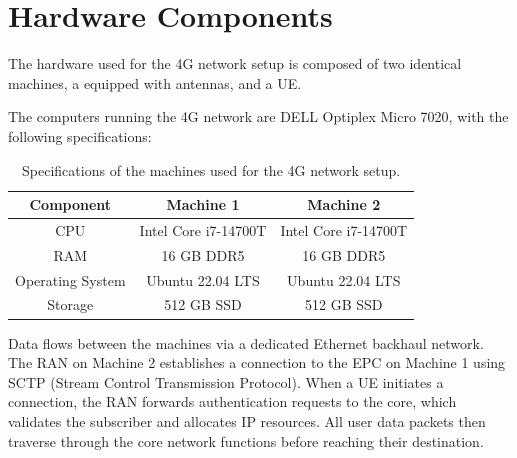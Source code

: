 \section{Hardware Components}
\label{sec:Hardware_Components}
The hardware used for the 4G network setup is composed of two identical machines, a  equipped with antennas, and a \gls{UE}.

The computers running the 4G network are DELL Optiplex Micro 7020, with the following specifications:
\begin{table}[H]
    \centering
    \begin{tabular}{|c|c|c|}
        \hline
        \textbf{Component} & \textbf{Machine 1} & \textbf{Machine 2} \\
        \hline
        CPU & Intel Core i7-14700T & Intel Core i7-14700T \\
        \hline
        RAM & 16 GB DDR5 & 16 GB DDR5 \\
        \hline
        Operating System & Ubuntu 22.04 LTS & Ubuntu 22.04 LTS \\
        \hline
        Storage & 512 GB SSD & 512 GB SSD \\
        \hline
    \end{tabular}
    \caption{Specifications of the machines used for the 4G network setup.}
\end{table}

Data flows between the machines via a dedicated Ethernet backhaul network. The RAN on Machine 2 establishes a connection to the EPC on Machine 1 using SCTP (Stream Control Transmission Protocol). When a UE initiates a connection, the RAN forwards authentication requests to the core, which validates the subscriber and allocates IP resources. All user data packets then traverse through the core network functions before reaching their destination.
